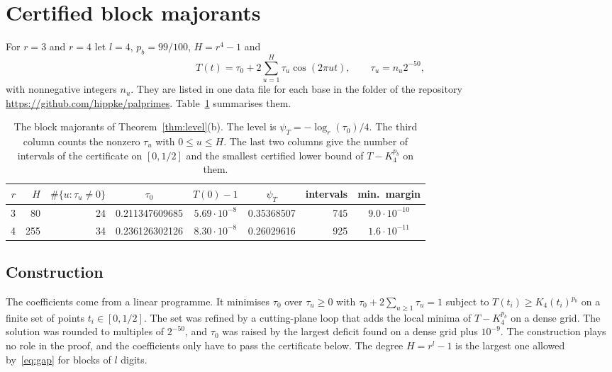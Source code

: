 \documentclass[11pt]{amsart}
\theoremstyle{definition}
\numberwithin{equation}{section}
\begin{document}
\section{Certified block majorants}\label{sec:blocks}

For $r=3$ and $r=4$ let $l=4$, $p_b=99/100$, $H=r^4-1$ and
\[
T(t)=\tau_0+2\sum_{u=1}^{H}\tau_u\cos(2\pi ut),\qquad\tau_u=n_u2^{-50},
\]
with nonnegative integers $n_u$. They are listed in one data file for each base in the folder  of the repository\\ \url{https://github.com/hippke/palprimes}. Table~\ref{tab:maj} summarises them.

\begin{table}[ht]
\caption{The block majorants of Theorem~\ref{thm:level}(b). The level is $\psi_T=-\log_r(\tau_0)/4$. The third column counts the nonzero $\tau_u$ with $0\le u\le H$. The last two columns give the number of intervals of the certificate on $[0,1/2]$ and the smallest certified lower bound of $T-K_4^{p_b}$ on them.}\label{tab:maj}
\begin{tabular}{rrrcccrc}
\toprule
$r$ & $H$ & $\#\{u:\tau_u\ne0\}$ & $\tau_0$ & $T(0)-1$ & $\psi_T$ & intervals & min.\ margin\\
\midrule
3 & 80 & 24 & 0.211347609685 & $5.69\cdot10^{-8}$ & 0.35368507 & 745 & $9.0\cdot10^{-10}$\\
4 & 255 & 34 & 0.236126302126 & $8.30\cdot10^{-8}$ & 0.26029616 & 925 & $1.6\cdot10^{-11}$\\
\bottomrule
\end{tabular}
\end{table}

\subsection{Construction}
The coefficients come from a linear programme. It minimises $\tau_0$ over $\tau_u\ge0$ with $\tau_0+2\sum_{u\ge1}\tau_u=1$ subject to $T(t_i)\ge K_4(t_i)^{p_b}$ on a finite set of points $t_i\in[0,1/2]$. The set was refined by a cutting-plane loop that adds the local minima of $T-K_4^{p_b}$ on a dense grid. The solution was rounded to multiples of $2^{-50}$, and $\tau_0$ was raised by the largest deficit found on a dense grid plus $10^{-9}$. The construction plays no role in the proof, and the coefficients only have to pass the certificate below. The degree $H=r^l-1$ is the largest one allowed by~\eqref{eq:gap} for blocks of $l$ digits.
\end{document}
